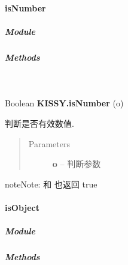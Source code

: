 \documentclass[letterpaper,10pt,english]{sphinxmanual}
\begin{document}
\paragraph{isNumber}
\label{api/seed/lang/isNumber:isnumber}\label{api/seed/lang/isNumber::doc}

\subparagraph{Module}
\label{api/seed/lang/isNumber:module}\begin{quote}

{\hyperref[api/seed/lang/index:module-Lang]{}}
\end{quote}


\subparagraph{Methods}
\label{api/seed/lang/isNumber:methods}

\begin{fulllineitems}
\label{api/seed/lang/isNumber:Lang.KISSY.isNumber}~
\begin{DUlineblock}{0em}
\item[] Boolean \textbf{KISSY.isNumber} (o)
\item[] 判断是否有效数值.
\end{DUlineblock}
\begin{quote}\begin{description}
\item[{Parameters}] \leavevmode
\textbf{o} -- 判断参数

\end{description}\end{quote}

\begin{notice}{note}{Note:}
 和  也返回 true
\end{notice}

\end{fulllineitems}



\paragraph{isObject}
\label{api/seed/lang/isObject::doc}\label{api/seed/lang/isObject:isobject}

\subparagraph{Module}
\label{api/seed/lang/isObject:module}\begin{quote}

{\hyperref[api/seed/lang/index:module-Lang]{}}
\end{quote}


\subparagraph{Methods}
\label{api/seed/lang/isObject:methods}
\end{document}
